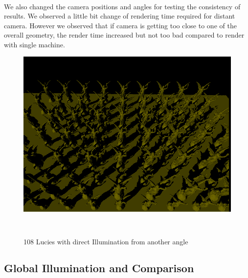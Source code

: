 \documentclass[a4paper, oneside, 10pt]{article}
\begin{document}
\paragraph{}We also changed the camera positions and angles for testing the consistency of results. We observed a little bit change of rendering time required for distant camera. However we observed that if camera is getting too close to one of the overall geometry, the render time increased but not too bad compared to render with single machine. 
\begin{figure}[h]
\centering
\includegraphics[width=\textwidth]{d108lucy_2}
\caption{108 Lucies with direct Illumination from another angle}\
\end{figure}
\subsection{Global Illumination and Comparison}
\end{document}
